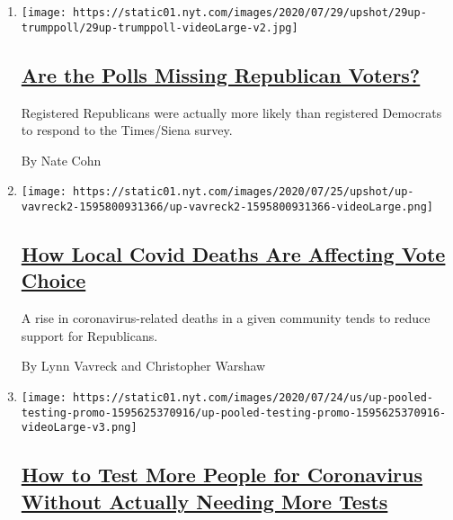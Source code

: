 \begin{enumerate}
\def\labelenumi{\arabic{enumi}.}
\item
  \texttt{[image: https://static01.nyt.com/images/2020/07/29/upshot/29up-trumppoll/29up-trumppoll-videoLarge-v2.jpg]}

  \hypertarget{are-the-polls-missing-republican-voters}{%
  \subsection{\texorpdfstring{\href{/2020/07/29/upshot/polls-political-party-republicans.html}{Are
  the Polls Missing Republican
  Voters?}}{Are the Polls Missing Republican Voters?}}\label{are-the-polls-missing-republican-voters}}

  Registered Republicans were actually more likely than registered
  Democrats to respond to the Times/Siena survey.

  By Nate Cohn
\item
  \texttt{[image: https://static01.nyt.com/images/2020/07/25/upshot/up-vavreck2-1595800931366/up-vavreck2-1595800931366-videoLarge.png]}

  \hypertarget{how-local-covid-deaths-are-affecting-vote-choice}{%
  \subsection{\texorpdfstring{\href{/2020/07/28/upshot/polling-trump-virus-election.html}{How
  Local Covid Deaths Are Affecting Vote
  Choice}}{How Local Covid Deaths Are Affecting Vote Choice}}\label{how-local-covid-deaths-are-affecting-vote-choice}}

  A rise in coronavirus-related deaths in a given community tends to
  reduce support for Republicans.

  By Lynn Vavreck and Christopher Warshaw
\item
  \texttt{[image: https://static01.nyt.com/images/2020/07/24/us/up-pooled-testing-promo-1595625370916/up-pooled-testing-promo-1595625370916-videoLarge-v3.png]}

  \hypertarget{how-to-test-more-people-for-coronavirus-without-actually-needing-more-tests}{%
  \subsection{\texorpdfstring{\href{/interactive/2020/07/27/upshot/coronavirus-pooled-testing.html}{How
  to Test More People for Coronavirus Without Actually Needing More
  Tests}}{How to Test More People for Coronavirus Without Actually Needing More Tests}}\label{how-to-test-more-people-for-coronavirus-without-actually-needing-more-tests}}


\end{enumerate}
